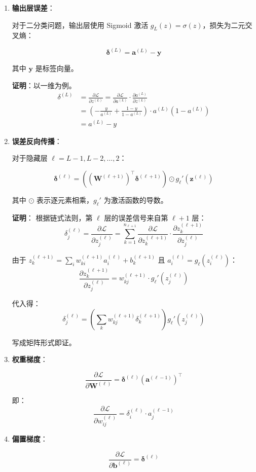 \begin{enumerate}
  \def\labelenumi{\arabic{enumi}.}
  \item
        \textbf{输出层误差}：

        对于二分类问题，输出层使用 Sigmoid 激活
        \(g_L(z) = \sigma(z)\)，损失为二元交叉熵：

        \[
          \boldsymbol{\delta}^{(L)} = \mathbf{a}^{(L)} - \mathbf{y}
        \]

        其中 \(\mathbf{y}\) 是标签向量。

        \textbf{证明}：以一维为例。 \[
          \begin{aligned}
            \delta^{(L)} & = \frac{\partial \mathcal{L}}{\partial z^{(L)}}
            = \frac{\partial \mathcal{L}}{\partial a^{(L)}} \cdot \frac{\partial a^{(L)}}{\partial z^{(L)}}   \\
                         & = \left(-\frac{y}{a^{(L)}} + \frac{1-y}{1-a^{(L)}}\right) \cdot a^{(L)}(1-a^{(L)}) \\
                         & = a^{(L)} - y
          \end{aligned}
        \]
  \item
        \textbf{误差反向传播}：

        对于隐藏层 \(\ell = L-1, L-2, \ldots, 2\)：

        \[
          \boldsymbol{\delta}^{(\ell)} = \left( (\mathbf{W}^{(\ell+1)})^\top \boldsymbol{\delta}^{(\ell+1)} \right) \odot g_\ell'(\mathbf{z}^{(\ell)})
        \]

        其中 \(\odot\) 表示逐元素相乘，\(g_\ell'\) 为激活函数的导数。

        \textbf{证明}： 根据链式法则，第 \(\ell\) 层的误差信号来自第
        \(\ell+1\) 层： \[
          \delta^{(\ell)}_j = \frac{\partial \mathcal{L}}{\partial z^{(\ell)}_j}
          = \sum_{k=1}^{n_{\ell+1}} \frac{\partial \mathcal{L}}{\partial z^{(\ell+1)}_k}
          \cdot \frac{\partial z^{(\ell+1)}_k}{\partial z^{(\ell)}_j}
        \]

        由于
        \(z^{(\ell+1)}_k = \sum_i w^{(\ell+1)}_{ki} a^{(\ell)}_i + b^{(\ell+1)}_k\)
        且 \(a^{(\ell)}_i = g_\ell(z^{(\ell)}_i)\)： \[
          \frac{\partial z^{(\ell+1)}_k}{\partial z^{(\ell)}_j} = w^{(\ell+1)}_{kj} \cdot g_\ell'(z^{(\ell)}_j)
        \]

        代入得： \[
          \delta^{(\ell)}_j = \left( \sum_{k} w^{(\ell+1)}_{kj} \delta^{(\ell+1)}_k \right) g_\ell'(z^{(\ell)}_j)
        \]

        写成矩阵形式即证。
  \item
        \textbf{权重梯度}：

        \[
          \frac{\partial \mathcal{L}}{\partial \mathbf{W}^{(\ell)}} = \boldsymbol{\delta}^{(\ell)} (\mathbf{a}^{(\ell-1)})^\top
        \]

        即： \[
          \frac{\partial \mathcal{L}}{\partial w^{(\ell)}_{ij}} = \delta^{(\ell)}_i \cdot a^{(\ell-1)}_j
        \]
  \item
        \textbf{偏置梯度}：

        \[
          \frac{\partial \mathcal{L}}{\partial \mathbf{b}^{(\ell)}} = \boldsymbol{\delta}^{(\ell)}
        \]
\end{enumerate}

